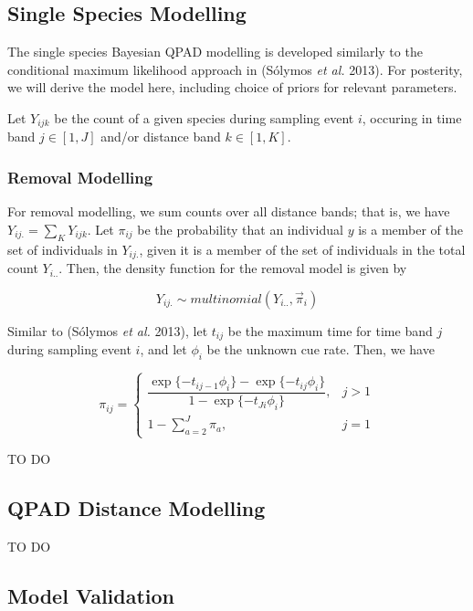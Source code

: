 \documentclass[
  11pt,
]{article}
\begin{document}
\hypertarget{single-species-modelling}{%
\subsection{Single Species Modelling}\label{single-species-modelling}}

The single species Bayesian QPAD modelling is developed similarly to the
conditional maximum likelihood approach in (Sólymos \emph{et al.} 2013).
For posterity, we will derive the model here, including choice of priors
for relevant parameters.

Let \(Y_{ijk}\) be the count of a given species during sampling event
\(i\), occuring in time band \(j \in [1,J]\) and/or distance band
\(k \in [1,K]\).

\hypertarget{removal-modelling}{%
\subsubsection{Removal Modelling}\label{removal-modelling}}

For removal modelling, we sum counts over all distance bands; that is,
we have \(Y_{ij.} = \sum_K Y_{ijk}\). Let \(\pi_{ij}\) be the
probability that an individual \(y\) is a member of the set of
individuals in \(Y_{ij.}\), given it is a member of the set of
individuals in the total count \(Y_{i..}\). Then, the density function
for the removal model is given by

\[
  Y_{ij.}\sim multinomial(Y_{i..}, \vec{\pi}_{i})
\]

Similar to (Sólymos \emph{et al.} 2013), let \(t_{ij}\) be the maximum
time for time band \(j\) during sampling event \(i\), and let \(\phi_i\)
be the unknown cue rate. Then, we have

\[
  \pi_{ij} = \begin{cases}
  \dfrac{\exp\{-t_{ij-1} \phi_i\} - \exp\{-t_{ij}\phi_i\}}{1-\exp\{-t_{Ji}\phi_i\}}, &\text{$j>1$} \\
  1-\sum_{a=2}^J \pi_a, &\text{$j=1$}
  \end{cases}
\]

TO DO

\hypertarget{qpad-distance-modelling}{%
\subsection{QPAD Distance Modelling}\label{qpad-distance-modelling}}

TO DO

\hypertarget{model-validation}{%
\subsection{Model Validation}\label{model-validation}}
\end{document}
